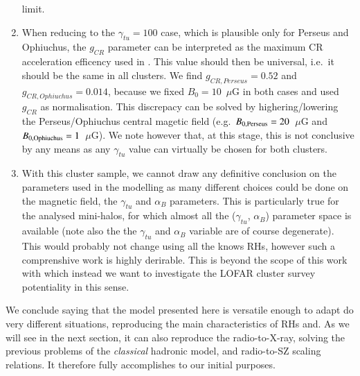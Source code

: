 \documentclass[traditabstract]{aa}
\begin{document}
\begin{enumerate}
       limit.
 \item When reducing to the $\gamma_{tu}=100$ case, which is plausible only for Perseus and Ophiuchus, the $g_{CR}$ parameter can be interpreted as the maximum
       CR acceleration efficency used in \cite{2010MNRAS.409..449P}. This value should then be universal, i.e.~it should be the same in all clusters. We find 
       $g_{CR, Perseus} = 0.52$ and $g_{CR, Ophiuchus} = 0.014$, because we fixed $B_{0}=10$~$\mu$G in both cases and used $g_{CR}$ as normalisation. This 
       discrepacy can be solved by highering/lowering the Perseus/Ophiuchus central magetic field (e.g.~$B_{0,\rm{Perseus}}=20$~$\mu$G and $B_{0,\rm{Ophiuchus}}=1$~$\mu  
       $G). We note however that, at this stage, this is not conclusive by any means as any $\gamma_{tu}$ value can virtually be chosen for both clusters. 
 \item With this cluster sample, we cannot draw any definitive conclusion on the parameters used in the modelling as many different choices could be done on
       the magnetic field, the $\gamma_{tu}$ and $\alpha_{B}$ parameters. This is particularly true for the analysed mini-halos, for which almost all the
       ($\gamma_{tu}$, $\alpha_B$) parameter space is available (note also the the $\gamma_{tu}$ and $\alpha_B$ variable are of course degenerate). This would probably not 
       change using all the knows RHs, however such a comprenshive work is highly derirable. This is beyond the scope of this work with which instead we want to investigate the 
       LOFAR cluster survey potentiality in this sense.
\end{enumerate}

We conclude saying that the model presented here is versatile enough to adapt do very different situations, reproducing the main characteristics of RHs and. As we will see in
the next section, it can also reproduce the radio-to-X-ray, solving the previous problems of the \emph{classical} hadronic model, and radio-to-SZ scaling relations. It therefore fully accomplishes to our initial purposes.
\end{document}

